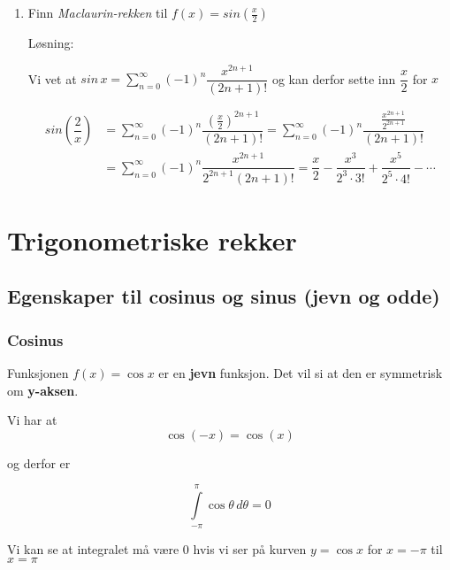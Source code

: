 \documentclass[11pt]{article}
\theoremstyle{definition}
\theoremstyle{definition}
\theoremstyle{definition}
\theoremstyle{definition}
\theoremstyle{definition}
\theoremstyle{definition}
\begin{document}
\begin{enumerate}
		    \item Finn \textit{Maclaurin-rekken} til \(f(x)=sin\left( \frac{x}{2}\right) \)
		    
		    Løsning:
		    
		     Vi vet at \(sin\,x=\displaystyle{\sum_{n=0}^{\infty}(-1)^n\dfrac{x^{2n+1}}{(2n+1)!}} \) og kan derfor sette inn \(\dfrac{x}{2}\) for \(x\)
		     
		     \begin{align*}
		     sin\left( \dfrac{2}{x} \right) &= \sum_{n=0}^{\infty}(-1)^n \dfrac{\left( \frac{x}{2} \right)^{2n+1} }{(2n+1)!}=\sum_{n=0}^{\infty}(-1)^n \dfrac{ \frac{x^{2n+1}}{2^{2n+1}} }{(2n+1)!}\\
		     &=\sum_{n=0}^{\infty}(-1)^n\dfrac{x^{2n+1}}{2^{2n+1}(2n+1)!}=\dfrac{x}{2}-\dfrac{x^3}{2^3\cdot 3!}+\dfrac{x^5}{2^5\cdot 4!}-\cdots
		     \end{align*}
			
		\end{enumerate}
		
		\newpage
		
		\section{Trigonometriske rekker}
			
		\subsection{Egenskaper til cosinus og sinus (jevn og odde)}
		
		
		\subsubsection{Cosinus}
		\label{sec:EgenskaperCos}
		
		Funksjonen \(f(x)=\cos x\) er en \textbf{jevn} funksjon. Det vil si at den er symmetrisk om \textbf{y-aksen}.
		
		Vi har at \[\cos(-x)=\cos(x) \]
		
		og derfor er 
		
		\[\int\limits_{-\pi}^{\pi}\cos \theta \,d\theta = 0  \]
		
		Vi kan se at integralet må være \(0\) hvis vi ser på kurven \(y=\cos x  \) for \(x=-\pi\) til \(x=\pi \)
		
\end{document}
